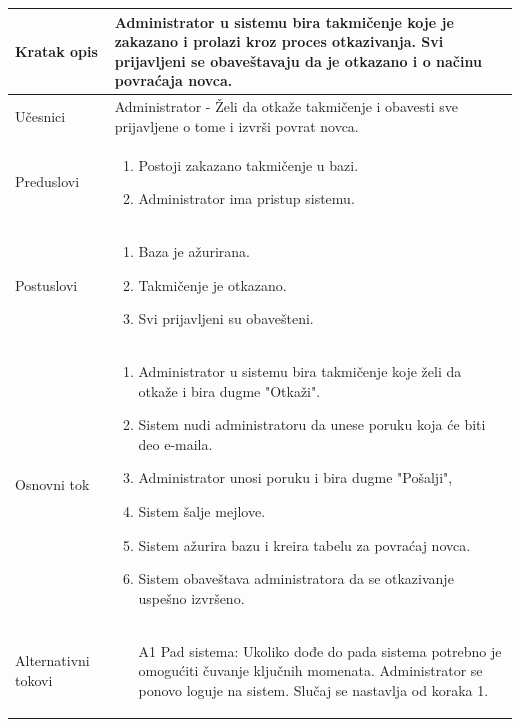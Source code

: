\documentclass[../../main.tex]{subfiles}
\begin{document}
\begin{longtable}{| p{} | p{} |} 
\hline
    Kratak opis &  Administrator u sistemu bira takmičenje koje je zakazano i prolazi kroz proces otkazivanja. Svi prijavljeni se obaveštavaju da je otkazano i o načinu povraćaja novca.\\ 
\hline    
    Učesnici & Administrator - Želi da otkaže takmičenje i obavesti sve prijavljene o tome i izvrši povrat novca.\\
\hline
   Preduslovi & \begin{enumerate}
       \item Postoji zakazano takmičenje u bazi.
       \item Administrator ima pristup sistemu.
   \end{enumerate}\\
\hline  
    Postuslovi & \begin{enumerate}
        \item Baza je ažurirana.
        \item Takmičenje je otkazano.
        \item Svi prijavljeni su obavešteni.
    \end{enumerate}\\
\hline
    Osnovni tok & \begin{enumerate}
        \item Administrator u sistemu bira takmičenje koje želi da otkaže i bira dugme "Otkaži".
        \item Sistem nudi administratoru da unese poruku koja će biti deo e-maila.
        \item Administrator unosi poruku i bira dugme "Pošalji",
        \item Sistem šalje mejlove.
        \item Sistem ažurira bazu i kreira tabelu za povraćaj novca.
        \item Sistem obaveštava administratora da se otkazivanje uspešno izvršeno.
    \end{enumerate}\\
\hline
    Alternativni tokovi & \begin{itemize}
        \item[A1] Pad sistema: Ukoliko dođe do pada sistema potrebno je omogućiti čuvanje ključnih momenata. Administrator se ponovo loguje na sistem. Slučaj se nastavlja od koraka 1.

\end{itemize}
\end{longtable}
\end{document}
